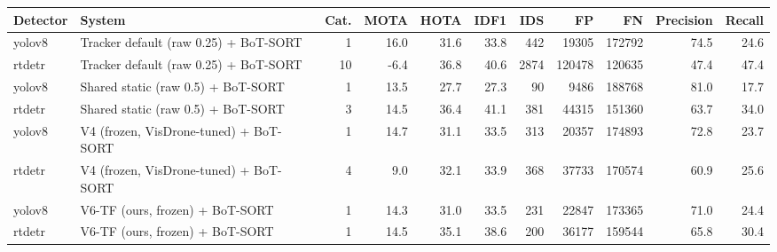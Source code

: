 \begin{tabular}{llrrrrrrrrr}
\toprule
Detector & System & Cat. & MOTA & HOTA & IDF1 & IDS & FP & FN & Precision & Recall \\
\midrule
yolov8 & Tracker default (raw 0.25) + BoT-SORT & 1 & 16.0 & 31.6 & 33.8 & 442 & 19305 & 172792 & 74.5 & 24.6 \\
rtdetr & Tracker default (raw 0.25) + BoT-SORT & 10 & -6.4 & 36.8 & 40.6 & 2874 & 120478 & 120635 & 47.4 & 47.4 \\
yolov8 & Shared static (raw 0.5) + BoT-SORT & 1 & 13.5 & 27.7 & 27.3 & 90 & 9486 & 188768 & 81.0 & 17.7 \\
rtdetr & Shared static (raw 0.5) + BoT-SORT & 3 & 14.5 & 36.4 & 41.1 & 381 & 44315 & 151360 & 63.7 & 34.0 \\
yolov8 & V4 (frozen, VisDrone-tuned) + BoT-SORT & 1 & 14.7 & 31.1 & 33.5 & 313 & 20357 & 174893 & 72.8 & 23.7 \\
rtdetr & V4 (frozen, VisDrone-tuned) + BoT-SORT & 4 & 9.0 & 32.1 & 33.9 & 368 & 37733 & 170574 & 60.9 & 25.6 \\
yolov8 & V6-TF (ours, frozen) + BoT-SORT & 1 & 14.3 & 31.0 & 33.5 & 231 & 22847 & 173365 & 71.0 & 24.4 \\
rtdetr & V6-TF (ours, frozen) + BoT-SORT & 1 & 14.5 & 35.1 & 38.6 & 200 & 36177 & 159544 & 65.8 & 30.4 \\
\bottomrule
\end{tabular}
